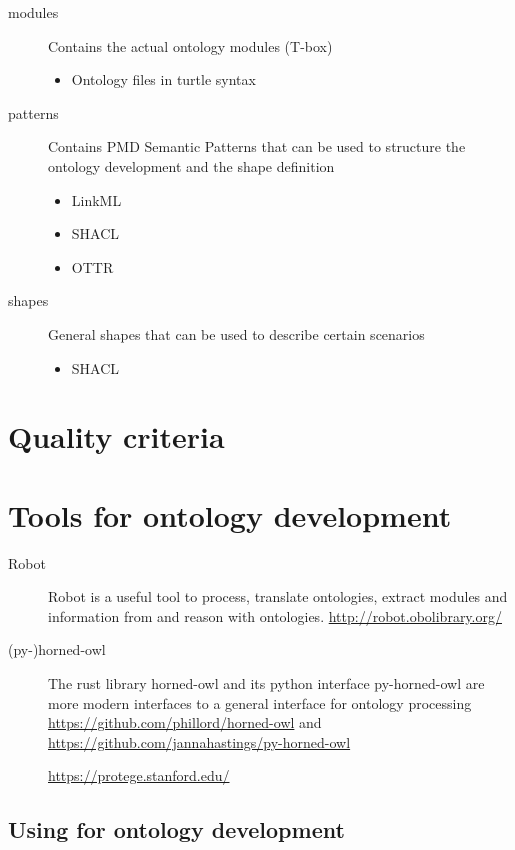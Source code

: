 \begin{description}
    \item[modules] Contains the actual ontology modules (T-box)
    \begin{itemize}
        \item Ontology files in turtle syntax
    \end{itemize}
    \item[patterns] Contains PMD Semantic Patterns that can be used to structure the ontology development and the shape definition
    \begin{itemize}
        \item LinkML
        \item SHACL
        \item OTTR
    \end{itemize}
    \item[shapes] General shapes that can be used to describe certain scenarios
    \begin{itemize}
        \item SHACL
    \end{itemize}
\end{description}


\section{Quality criteria}

\section{Tools for ontology development}

\begin{description}
    \item[Robot] Robot is a useful tool to process, translate ontologies, extract modules and information from and reason with ontologies. \url{http://robot.obolibrary.org/}
    \item[(py-)horned-owl] The rust library horned-owl and its python interface py-horned-owl are more modern interfaces to a general interface for ontology processing \url{https://github.com/phillord/horned-owl} and \url{https://github.com/jannahastings/py-horned-owl}
    \item[{\protege}] \url{https://protege.stanford.edu/}
\end{description}

\subsection{Using {\protege} for ontology development}
\label{ssec:using-protege}